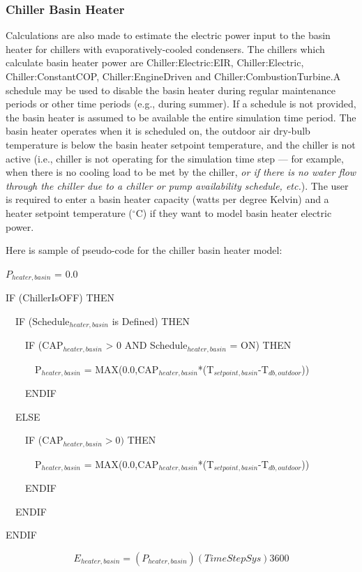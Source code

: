\subsubsection{Chiller Basin Heater}\label{chiller-basin-heater-3}

Calculations are also made to estimate the electric power input to the basin heater for chillers with evaporatively-cooled condensers. The chillers which calculate basin heater power are Chiller:Electric:EIR, Chiller:Electric, Chiller:ConstantCOP, Chiller:EngineDriven and Chiller:CombustionTurbine.A schedule may be used to disable the basin heater during regular maintenance periods or other time periods (e.g., during summer). If a schedule is not provided, the basin heater is assumed to be available the entire simulation time period. The basin heater operates when it is scheduled on, the outdoor air dry-bulb temperature is below the basin heater setpoint temperature, and the chiller is not active (i.e., chiller is not operating for the simulation time step --- for example, when there is no cooling load to be met by the chiller, \emph{or if there is no water flow through the chiller due to a chiller or pump availability schedule, etc.}). The user is required to enter a basin heater capacity (watts per degree Kelvin) and a heater setpoint temperature (\(^{\circ}\)C) if they want to model basin heater electric power.

Here is sample of pseudo-code for the chiller basin heater model:

\(P_{heater,basin}\) = 0.0

IF (ChillerIsOFF) THEN

~~IF (Schedule\(_{heater,basin}\) is Defined) THEN

~~~~IF (CAP\(_{heater,basin}\) > 0 AND Schedule\(_{heater,basin}\) = ON) THEN

~~~~~~P\(_{heater,basin}\) = MAX(0.0,CAP\(_{heater,basin}\)*(T\(_{setpoint,basin}\)-T\(_{db,outdoor}\)))

~~~~ENDIF

~~ELSE

~~~~IF (CAP\(_{heater,basin} > 0)\) THEN

~~~~~~P\(_{heater,basin}\) = MAX(0.0,CAP\(_{heater,basin}\)*(T\(_{setpoint,basin}\)-T\(_{db,outdoor}\)))

~~~~ENDIF

~~ENDIF

ENDIF

\begin{equation}
{E_{heater,basin}} = \left( {{P_{heater,basin}}} \right)\left( {TimeStepSys} \right)3600
\end{equation}

